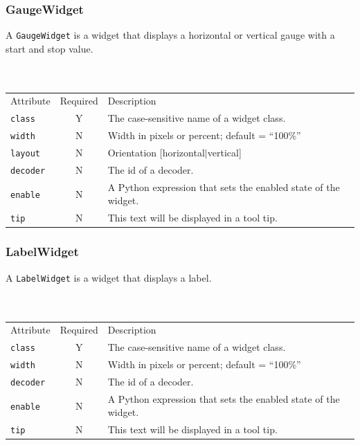 \documentclass[a4paper,twoside,12pt]{article}
\newcommand{\code}[1]{\color{red}\texttt{#1}\color{black}}
\begin{document}
\subsubsection{GaugeWidget}
A \code{GaugeWidget}{} is a widget that displays a horizontal or
vertical gauge with a start and stop value.
\\
\\
\\
\begin{tabular}{|l|c|p{9cm}|}
\hline
Attribute & Required & Description \\
\code{class} & Y & The case-sensitive name of a widget class. \\
\code{width} & N & Width in pixels or percent; default = ``100\%'' \\
\code{layout} & N & Orientation [horizontal$|$vertical] \\
\code{decoder} & N & The id of a decoder. \\
\code{enable} & N & A Python expression that sets the
enabled state of the widget. \\
\code{tip} & N & This text will be displayed in a tool tip. \\
\hline
\end{tabular}

\subsubsection{LabelWidget}
A \code{LabelWidget}{} is a widget that displays a label.
\\
\\
\\
\begin{tabular}{|l|c|p{9cm}|}
\hline
Attribute & Required & Description \\
\code{class} & Y & The case-sensitive name of a widget class. \\
\code{width} & N & Width in pixels or percent; default = ``100\%'' \\
\code{decoder} & N & The id of a decoder. \\
\code{enable} & N & A Python expression that sets the
enabled state of the widget. \\
\code{tip} & N & This text will be displayed in a tool tip. \\
\hline
\end{tabular}
\end{document}

